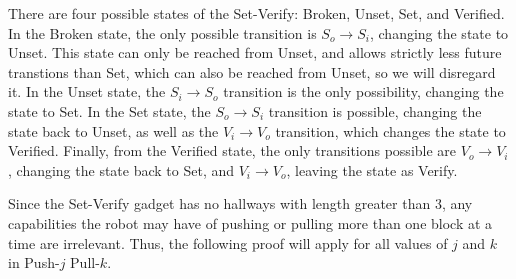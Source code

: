 \documentclass[11pt]{article}
\begin{document}
There are four possible states of the Set-Verify: Broken, Unset, Set, and Verified. In the Broken state, the only possible transition is $S_o \rightarrow S_i$, changing the state to Unset. This state can only be reached from Unset, and allows strictly less future transtions than Set, which can also be reached from Unset, so we will disregard it. In the Unset state, the $S_i \rightarrow S_o$ transition is the only possibility, changing the state to Set. In the Set state, the $S_o \rightarrow S_i$ transition is possible, changing the state back to Unset, as well as the $V_i \rightarrow V_o$ transition, which changes the state to Verified. Finally, from the Verified state, the only transitions possible are $V_o \rightarrow V_i$, changing the state back to Set, and $V_i \rightarrow V_o$, leaving the state as Verify.

Since the Set-Verify gadget has no hallways with length greater than 3, any capabilities the robot may have of
pushing or pulling more than one block at a time are irrelevant. Thus, the following proof will apply
for all values of $j$ and $k$ in Push-$j$ Pull-$k$.
\end{document}
